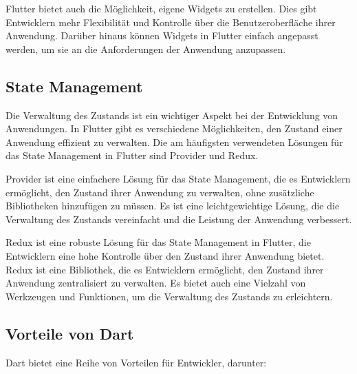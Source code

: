 Flutter bietet auch die Möglichkeit, eigene Widgets zu erstellen. Dies gibt Entwicklern mehr Flexibilität und Kontrolle über die Benutzeroberfläche ihrer Anwendung. Darüber hinaus können Widgets in Flutter einfach angepasst werden, um sie an die Anforderungen der Anwendung anzupassen.

\subsection{State Management}

Die Verwaltung des Zustands ist ein wichtiger Aspekt bei der Entwicklung von Anwendungen. In Flutter gibt es verschiedene Möglichkeiten, den Zustand einer Anwendung effizient zu verwalten. Die am häufigsten verwendeten Lösungen für das State Management in Flutter sind Provider und Redux.

Provider ist eine einfachere Lösung für das State Management, die es Entwicklern ermöglicht, den Zustand ihrer Anwendung zu verwalten, ohne zusätzliche Bibliotheken hinzufügen zu müssen. Es ist eine leichtgewichtige Lösung, die die Verwaltung des Zustands vereinfacht und die Leistung der Anwendung verbessert.

Redux ist eine robuste Lösung für das State Management in Flutter, die Entwicklern eine hohe Kontrolle über den Zustand ihrer Anwendung bietet. Redux ist eine Bibliothek, die es Entwicklern ermöglicht, den Zustand ihrer Anwendung zentralisiert zu verwalten. Es bietet auch eine Vielzahl von Werkzeugen und Funktionen, um die Verwaltung des Zustands zu erleichtern.
\newpage
\subsection{Vorteile von Dart}

Dart bietet eine Reihe von Vorteilen für Entwickler, darunter:

